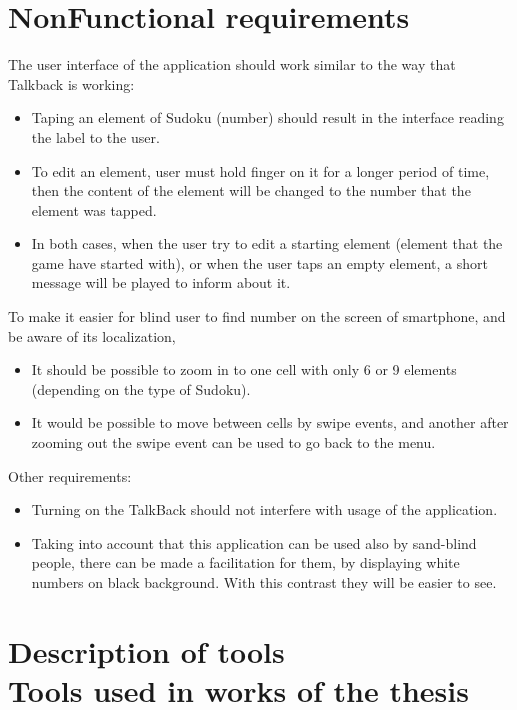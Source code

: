 \documentclass[a4paper,twoside,12pt]{book}
\begin{document}
\section{NonFunctional requirements}
\par
The user interface of the application should work similar to the way that Talkback is working: 
\begin{itemize}
\item Taping an element of Sudoku (number) should result in the interface reading the label to the user.
\item To edit an element, user must hold finger on it for a longer period of time, then the content of the element will be changed to the number that the element was tapped. 
\item In both cases, when the user try to edit a starting element (element that the game have started with), or when the user taps an empty element, a short message will be played to inform about it.
\end{itemize}
\par
To make it easier for blind user to find number on the screen of smartphone, and be aware of its localization,
\begin{itemize}
\item It should be possible to zoom in to one cell with only 6 or 9 elements (depending on the type of Sudoku).
\item It would be possible to move between cells by swipe events, and another after zooming out the swipe event can be used to go back to the menu.
\end{itemize}
\par
Other requirements:
\begin{itemize}
\item Turning on the TalkBack should not interfere with usage of the application.
\item Taking into account that this application can be used also by sand-blind people, there can be made a facilitation for them, by displaying white numbers on black background. With this contrast they will be easier to see.
\end{itemize}

\section {Description of tools\\{\large Tools used in works of the thesis}}%
\end{document}
